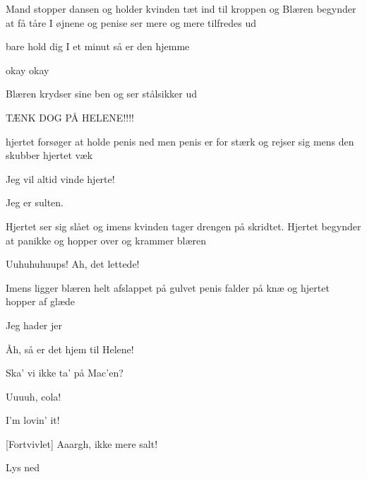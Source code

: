 \documentclass[a4paper,11pt]{article}
\begin{document}
\begin{sketch}
\scene Mand stopper dansen og holder kvinden tæt ind til kroppen og Blæren begynder at få tåre I øjnene og penise ser mere og mere tilfredes ud

 bare hold dig I et minut så er den hjemme

 okay okay

\scene Blæren krydser sine ben og ser stålsikker ud

 TÆNK DOG PÅ HELENE!!!!

\scene hjertet forsøger at holde penis ned men penis er for stærk og rejser sig mens den skubber hjertet væk

 Jeg vil altid vinde hjerte!

 Jeg er sulten.

\scene Hjertet ser sig slået og imens kvinden tager drengen på skridtet. Hjertet begynder at panikke og hopper over og krammer blæren

 Uuhuhuhuups! Ah, det lettede!


\scene Imens ligger blæren helt afslappet på gulvet penis falder på knæ og hjertet hopper af glæde

 Jeg hader jer

 Åh, så er det hjem til Helene!

 Ska' vi ikke ta' på Mac'en?

 Uuuuh, cola!

 I'm lovin' it!

[Fortvivlet] Aaargh, ikke mere salt! %

\scene Lys ned

\end{sketch}
\end{document}
